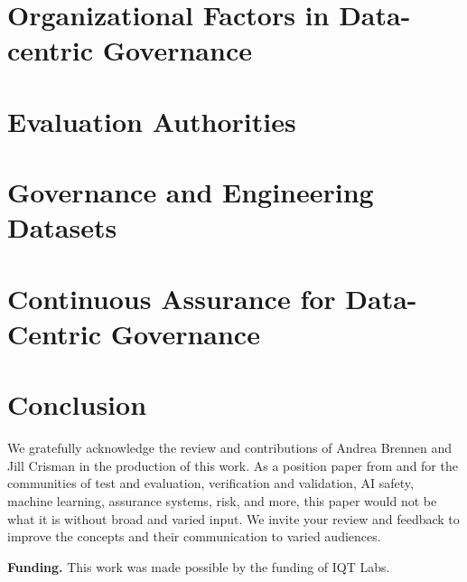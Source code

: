\documentclass{article}
\begin{document}
\section{Organizational Factors in Data-centric Governance}
\label{sec:teams}


\section{Evaluation Authorities}
\label{sec:evaluationauthorities}


\section{Governance and Engineering Datasets}
\label{sec:data}



\section{Continuous Assurance for Data-Centric Governance}
\label{sec:outline_systems}


\section{Conclusion}
\label{sec:conclusion}


\begin{ack}
We gratefully acknowledge the review and contributions of Andrea Brennen and Jill Crisman in the production of this work. As a position paper from and for the communities of test and evaluation, verification and validation, AI safety, machine learning, assurance systems, risk, and more, this paper would not be what it is without broad and varied input. We invite your review and feedback to improve the concepts and their communication to varied audiences.

\textbf{Funding.} This work was made possible by the funding of IQT Labs.
\end{ack}




% 
% 
% 
% 
% 
% 
\end{document}
